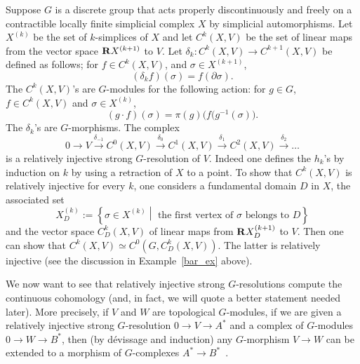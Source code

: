 \begin{exam}\label{simplicial_ex}
Suppose $G$ is a discrete group that acts properly discontinuously and freely on a contractible locally finite simplicial complex $X$ by simplicial automorphisms. Let $X^{(k)}$ be the set of $k$-simplices of $X$ and let $C^k (X, V)$ be the set of linear maps from the vector space ${\bf R} X^{(k+1)}$ to $V$. Let $\delta _k: C^k (X, V) \to C^{k+1} (X,V)$ be defined as follows; for $f \in C^k (X, V)$, and $\sigma \in X^{(k+1)}$,
\[
(\delta _k f)(\sigma) = f(\partial \sigma).
\]
The $C^k (X, V)$'s are $G$-modules for the following action: for $g \in G$, $f \in C^k(X,V)$ and $\sigma \in X^{(k)}$,
\[
(g \cdot f) (\sigma) = \pi (g) \bigl(f(g^{-1}(\sigma)\bigl).
\]
The $\delta _k$'s are $G$-morphisms. The complex
\[
0 \to V \stackrel{\delta_{-1}}{\to} C^0(X,V) \stackrel{\delta_0}{\to} C^1(X,V) \stackrel{\delta_1}{\to} C^2(X,V) \stackrel{\delta_2}{\to}\dots
\]
is a relatively injective strong $G$-resolution of $V$. Indeed one defines the $h_k$'s by induction on $k$ by using a retraction of $X$ to a point. To show that $C^k (X, V)$ is relatively injective for every $k$, one considers a fundamental domain $D$ in $X$, the associated set
\[
X_D^{(k)}:= \left\{\sigma \in X^{(k)} \middle|\text{ the first vertex of } \sigma \text{ belongs to } D\right\}
\]
and the vector space $C_D ^k (X,V)$ of linear maps from ${\bf R} X _D ^{(k+1)}$ to $V$. Then one can show that $C^k(X,V) \simeq C^0(G, C_D ^k (X,V))$. The latter is relatively injective (see the discussion in Example~\ref{bar_ex} above).
\end{exam}


We now want to see that relatively injective strong $G$-resolutions compute the continuous cohomology (and, in fact, we will quote a better statement needed later). More precisely, if $V$ and $W$ are topological $G$-modules, if we are given a relatively injective strong $G$-resolution $0 \to V \to A^*$ and a complex of $G$-modules\linebreak$0 \to W\to B^*$, then (by dévissage and induction) any $G$-morphism $V \to W$ can be extended to a morphism of $G$-complexes $A^* \to B^*$~\cite[Chapter~III, \textsection~1, Proposition~1.1 p.~177]{Gui}.

